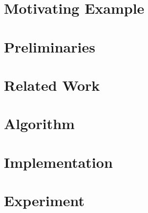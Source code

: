 \documentclass{llncs}
\begin{document}
\section{Motivating Example}
\label{sec:mot-example}



\section{Preliminaries}
\label{sec:preliminaries}



\section{Related Work}
\label{sec:related-work}



\section{Algorithm}
\label{sec:algorithm}



\section{Implementation}
\label{sec:impl}



\section{Experiment}
\label{sec:experiment}

\end{document}
